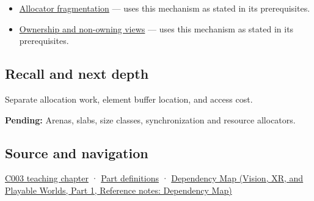 \hypertarget{appendix-c3480f7d9ff3-used-by}{}

\begin{itemize}
\tightlist
\item
  \hyperref[appendix-a7c50686d81f]{Allocator fragmentation} --- uses this mechanism as stated in its prerequisites.
\item
  \hyperref[appendix-d52e4486f527]{Ownership and non-owning views} --- uses this mechanism as stated in its prerequisites.
\end{itemize}

\subsection{Recall and next depth}\label{appendix-c3480f7d9ff3-recall-and-next-depth}

\hypertarget{appendix-c3480f7d9ff3-recall-and-next-depth}{}

Separate allocation work, element buffer location, and access cost.

\textbf{Pending:} Arenas, slabs, size classes, synchronization and resource allocators.

\subsection{Source and navigation}\label{appendix-c3480f7d9ff3-source-and-navigation}

\hypertarget{appendix-c3480f7d9ff3-source-and-navigation}{}

\hyperref[01-foundations-i-ch002-where-the-bytes-live]{C003 teaching chapter} · \hyperref[appendix-fd090d982a15-m003---parts-41-60]{Part definitions} · \href{../07-Vision-XR-and-Playable-Worlds-P01/main.pdf\#appendix-4ad47bdd269a}{Dependency Map (Vision, XR, and Playable Worlds, Part 1, Reference notes: Dependency Map)}
